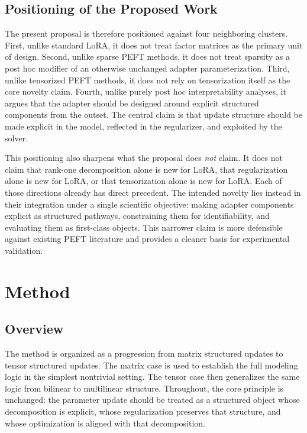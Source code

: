 \documentclass[11pt]{article}
\begin{document}
\subsection{Positioning of the Proposed Work}

The present proposal is therefore positioned against four neighboring clusters. First, unlike standard LoRA, it does not treat factor matrices as the primary unit of design. Second, unlike sparse PEFT methods, it does not treat sparsity as a post hoc modifier of an otherwise unchanged adapter parameterization. Third, unlike tensorized PEFT methods, it does not rely on tensorization itself as the core novelty claim. Fourth, unlike purely post hoc interpretability analyses, it argues that the adapter should be designed around explicit structured components from the outset. The central claim is that update structure should be made explicit in the model, reflected in the regularizer, and exploited by the solver.

This positioning also sharpens what the proposal does \emph{not} claim. It does not claim that rank-one decomposition alone is new for LoRA, that regularization alone is new for LoRA, or that tensorization alone is new for LoRA. Each of those directions already has direct precedent. The intended novelty lies instead in their integration under a single scientific objective: making adapter components explicit as structured pathways, constraining them for identifiability, and evaluating them as first-class objects. This narrower claim is more defensible against existing PEFT literature and provides a cleaner basis for experimental validation.

\section{Method}

\subsection{Overview}

The method is organized as a progression from matrix structured updates to tensor structured updates. The matrix case is used to establish the full modeling logic in the simplest nontrivial setting. The tensor case then generalizes the same logic from bilinear to multilinear structure. Throughout, the core principle is unchanged: the parameter update should be treated as a structured object whose decomposition is explicit, whose regularization preserves that structure, and whose optimization is aligned with that decomposition.
\end{document}
